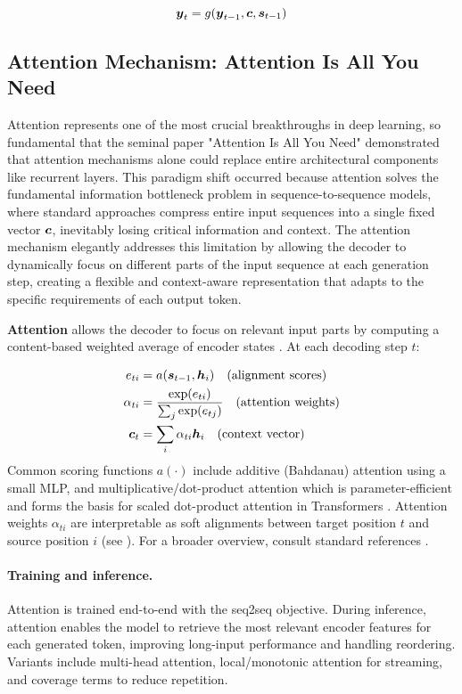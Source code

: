 \begin{equation}
\boldsymbol{y}_t = g(\boldsymbol{y}_{t-1}, \boldsymbol{c}, \boldsymbol{s}_{t-1})
\end{equation}

\subsection{Attention Mechanism: Attention Is All You Need}

Attention represents one of the most crucial breakthroughs in deep learning, so fundamental that the seminal paper "Attention Is All You Need" \cite{Vaswani2017} demonstrated that attention mechanisms alone could replace entire architectural components like recurrent layers. This paradigm shift occurred because attention solves the fundamental information bottleneck problem in sequence-to-sequence models, where standard approaches compress entire input sequences into a single fixed vector $\boldsymbol{c}$, inevitably losing critical information and context. The attention mechanism elegantly addresses this limitation by allowing the decoder to dynamically focus on different parts of the input sequence at each generation step, creating a flexible and context-aware representation that adapts to the specific requirements of each output token.

\textbf{Attention} allows the decoder to focus on relevant input parts by computing a content-based weighted average of encoder states \cite{Bahdanau2014}. At each decoding step $t$:

\begin{align}
e_{ti} &= a(\boldsymbol{s}_{t-1}, \boldsymbol{h}_i) \quad \text{(alignment scores)} \\
\alpha_{ti} &= \frac{\exp(e_{ti})}{\sum_j \exp(e_{tj})} \quad \text{(attention weights)} \\
\boldsymbol{c}_t &= \sum_i \alpha_{ti} \boldsymbol{h}_i \quad \text{(context vector)}
\end{align}
Common scoring functions $a(\cdot)$ include additive (Bahdanau) attention using a small MLP, and multiplicative/dot-product attention which is parameter-efficient and forms the basis for scaled dot-product attention in Transformers \cite{Vaswani2017}. Attention weights $\alpha_{ti}$ are interpretable as soft alignments between target position $t$ and source position $i$ (see \cite{WebAttentionWikipedia}). For a broader overview, consult standard references \cite{WebDLBRNN,D2LChapterAttention}.

\paragraph{Training and inference.} Attention is trained end-to-end with the seq2seq objective. During inference, attention enables the model to retrieve the most relevant encoder features for each generated token, improving long-input performance and handling reordering. Variants include multi-head attention, local/monotonic attention for streaming, and coverage terms to reduce repetition.

